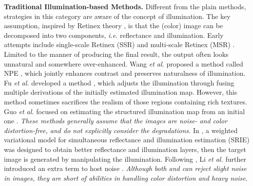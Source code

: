 \documentclass[journal,10pt,compsoc]{IEEEtran}
\begin{document}
\textbf{Traditional Illumination-based Methods.} Different from the plain methods, strategies in this category are aware of the concept of illumination. The key assumption, inspired by Retinex theory \cite{Land1977The}, is that the (color) image can be decomposed into two components, {\it i.e.} reflectance and illumination. Early attempts include single-scale Retinex (SSR) \cite{SSR} and multi-scale Retinex (MSR) \cite{MSR}. Limited to the manner of producing the final result, the output often looks unnatural and somewhere over-enhanced. Wang {\it et al.} proposed a method called NPE \cite{NPE}, which jointly enhances contrast and preserves naturalness of illumination. Fu {\it et al.} developed a method \cite{Fu2016A}, which adjusts the illumination through fusing multiple derivations of the initially estimated illumination map. However, this method sometimes sacrifices the realism of those regions containing rich textures. Guo {\it et al.} focused on estimating the structured illumination map from an initial one \cite{LIME}. {\it  These methods generally assume that the images are noise- and color distortion-free, and do not explicitly consider the degradations.} In \cite{SRIE}, a weighted variational model for simultaneous reflectance and illumination estimation (SRIE) was designed to obtain better reflectance and illumination layers, then the target image is generated by manipulating the illumination. Following \cite{LIME}, Li {\it et al.} further introduced an extra term to host noise \cite{RRM}. {\it Although both \cite{SRIE} and \cite{RRM} can reject slight noise in images, they are short of abilities in handling color distortion and heavy noise.} 
\end{document}
